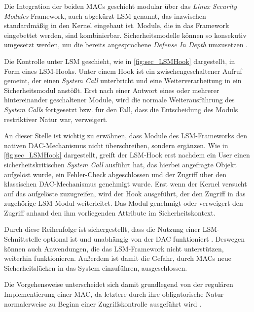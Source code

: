 \documentclass[../main.tex]{subfiles}
\begin{document}
			Die Integration der beiden MACs geschieht modular über das \emph{Linux Security Modules}-Framework, auch abgekürzt \acrshort{LSM} genannt, das inzwischen standardmäßig in den Kernel eingebaut ist. Module, die in das Framework eingebettet werden, sind kombinierbar. Sicherheitsmodelle können so konsekutiv umgesetzt werden, um die bereits angesprochene \emph{Defense In Depth} umzusetzen \cite[S.3]{LSMFramework}.

			Die Kontrolle unter LSM geschieht, wie in \fig \ref{fig:sec_LSMHook} dargestellt, in Form eines LSM-Hooks. Unter einem Hook ist ein zwischengeschaltener Aufruf gemeint, der einen \emph{System Call} unterbricht und eine Weiterverarbeitung in ein Sicherheitsmodul anstößt. Erst nach einer Antwort eines oder mehrerer hintereinander geschaltener Module, wird die normale Weiterausführung des \emph{System Calls} fortgesetzt bzw. für den Fall, dass die Entscheidung des Moduls restriktiver Natur war, verweigert.

			An dieser Stelle ist wichtig zu erwähnen, dass Module des LSM-Frameworks den nativen DAC-Mechanismus nicht überschreiben, sondern ergänzen. Wie in \fig \ref{fig:sec_LSMHook} dargestellt, greift der LSM-Hook erst nachdem ein User einen sicherheitskritischen \emph{System Call} ausführt hat, das hierbei angefragte Objekt aufgelöst wurde, ein Fehler-Check abgeschlossen und der Zugriff über den klassischen DAC-Mechanismus genehmigt wurde. Erst wenn der Kernel versucht auf das aufgelöste  zuzugreifen, wird der Hook ausgeführt, der den Zugriff in das zugehörige LSM-Modul weiterleitet. Das Modul genehmigt oder verweigert den Zugriff anhand den ihm vorliegenden Attribute im Sicherheitskontext.

			Durch diese Reihenfolge ist sichergestellt, dass die Nutzung einer LSM-Schnittstelle optional ist und unabhängig von der DAC funktioniert \cite{centOsMCS}. Deswegen können auch Anwendungen, die das LSM-Framework nicht unterstützen, weiterhin funktionieren. Außerdem ist damit die Gefahr, durch MACs neue Sicherheitslücken in das System einzuführen, ausgeschlossen.

			Die Vorgehensweise unterscheidet sich damit grundlegend von der regulären Implementierung einer MAC, da letztere durch ihre obligatorische Natur normalerweise zu Beginn einer Zugriffskontrolle ausgeführt wird \cite[S.3]{LSMFramework}.
\end{document}
